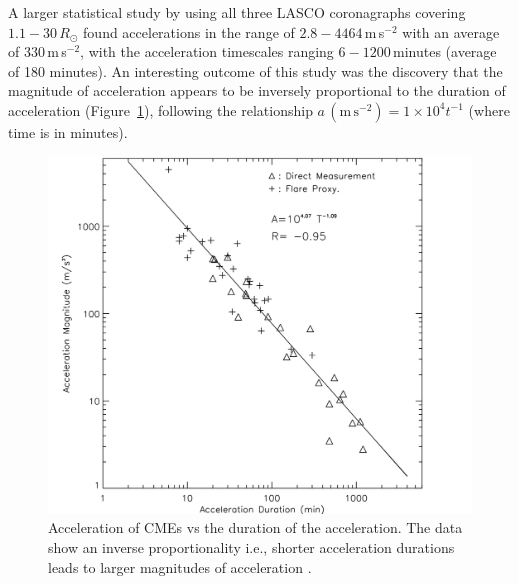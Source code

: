 A larger statistical study by \citet{zhang2006} using all three LASCO coronagraphs covering $1.1-30\,R_{\odot}$ found accelerations in the range of $2.8-4464$\,m\,s$^{-2}$ with an average of 330\,m\,s$^{-2}$, with the acceleration timescales ranging $6-1200$\,minutes (average of 180 minutes). An interesting outcome of this study was the discovery that the magnitude of acceleration appears to be inversely proportional to the duration of acceleration (Figure~\ref{fig:acell_duration}), following the relationship  {\color{blue} $a\,(\mathrm{m\,s}^{-2}) =1\times10^4t^{-1}$ (where time is in minutes)}.

\begin{figure}[t!]
\begin{center}
\includegraphics[scale=0.25]{images/accel_zhang2006}
\caption[CME acceleration as a function of acceleration duration]{Acceleration of CMEs vs the duration of the acceleration. The data show an inverse proportionality i.e., shorter acceleration durations leads to larger magnitudes of acceleration \citep{zhang2006}.}
\label{fig:acell_duration}
\end{center}
\end{figure}

